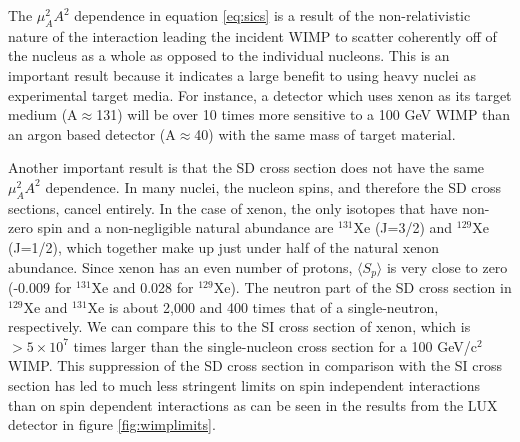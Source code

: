 The $\mu_A^2A^2$ dependence in equation \ref{eq:sics} is a result of the non-relativistic nature of the interaction leading the incident WIMP to scatter coherently off of the nucleus as a whole as opposed to the individual nucleons. This is an important result because it indicates a large benefit to using heavy nuclei as experimental target media. For instance, a detector which uses xenon as its target medium (A$\approx$131) will be over 10 times more sensitive to a 100 GeV WIMP than an argon based detector (A$\approx$40) with the same mass of target material. 

Another important result is that the SD cross section does not have the same $\mu_A^2A^2$ dependence. In many nuclei, the nucleon spins, and therefore the SD cross sections, cancel entirely. In the case of xenon, the only isotopes that have non-zero spin and a non-negligible natural abundance are $^{131}$Xe (J=3/2) and $^{129}$Xe (J=1/2), which together make up just under half of the natural xenon abundance. Since xenon has an even number of protons, $\langle S_p \rangle$ is very close to zero (-0.009 for $^{131}$Xe and 0.028 for $^{129}$Xe). The neutron part of the SD cross section in $^{129}$Xe and $^{131}$Xe is about 2,000 and 400 times that of a single-neutron, respectively\cite{dmintro}. We can compare this to the SI cross section of xenon, which is $>5\times 10^7$ times larger than the single-nucleon cross section for a 100 GeV/c$^2$ WIMP. This suppression of the SD cross section in comparison with the SI cross section has led to much less stringent limits on spin independent interactions than on spin dependent interactions as can be seen in the results from the LUX detector in figure \ref{fig:wimplimits}.
